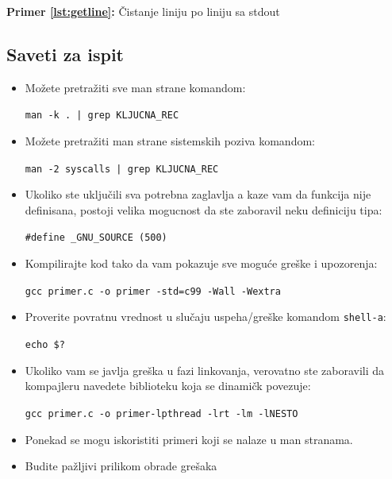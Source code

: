 \documentclass[a4paper, 11pt, twoside]{article}
\newcommand{\scode}[3] {
	\hspace{.06\textwidth} 
	\begin{minipage}[t]{.88\textwidth} %
		\begin{mdframed}[topline=true,bottomline=true,leftline=true,rightline=true,backgroundcolor=gray!22, linecolor=gray!60!black,roundcorner=1mm]
			 

	\begin{center}
		\caption{\textbf{Primer \ref{lst:#3}:} #2}
	\end{center}
	\end{mdframed}
	\end{minipage}

}
\begin{document}
\scode{getline.c}{Čistanje liniju po liniju sa stdout}{getline}

\subsection{Saveti za ispit}

\begin{itemize}
	\item{Možete pretražiti sve man strane komandom: \\ \vspace{-3mm} \begin{center}\texttt{man -k . | grep KLJUCNA\_REC}\end{center}}
			\vspace{1mm} 
	\item{Možete pretražiti man strane sistemskih poziva komandom: \\ \vspace{-3mm} \begin{center}\texttt{man -2 syscalls | grep KLJUCNA\_REC}\end{center}}
			\vspace{1mm} 
		\item{Ukoliko ste uključili sva potrebna zaglavlja a kaze vam da funkcija nije definisana, postoji velika mogucnost da ste zaboravil neku definiciju tipa: \\ \vspace{-3mm} \begin{center}\texttt{\#define \_GNU\_SOURCE (500)}\end{center}}
			\vspace{1mm} 
	\item{Kompilirajte kod tako da vam pokazuje sve moguće greške i upozorenja: \\ \vspace{-3mm} \begin{center}\texttt{gcc primer.c -o primer -std=c99 -Wall -Wextra}\end{center}}
			\vspace{1mm} 
	\item{Proverite povratnu vrednost u slučaju uspeha/greške komandom \texttt{shell-a}: \\ \vspace{-3mm} \begin{center}\texttt{echo \$?}\end{center}}
			\vspace{1mm} 
	\item{Ukoliko vam se javlja greška u fazi linkovanja, verovatno ste zaboravili da kompajleru navedete biblioteku koja se dinamičk povezuje: \\ \vspace{-3mm} \begin{center}\texttt{gcc primer.c -o primer-lpthread -lrt -lm -lNESTO}\end{center}}
			\vspace{1mm} 
		\item{Ponekad se mogu iskoristiti primeri koji se nalaze u man stranama.}
			\vspace{1mm} 
			\item{Budite pažljivi prilikom obrade grešaka}
\end{itemize}
\end{document}
